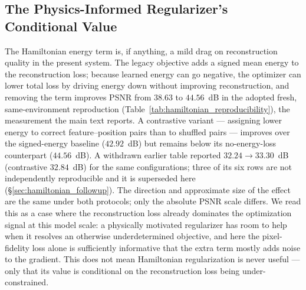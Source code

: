 \documentclass[11pt]{article}
\begin{document}
\subsection{The Physics-Informed Regularizer's Conditional Value}
The Hamiltonian energy term is, if anything, a mild drag on reconstruction quality in the present system. The legacy objective adds a signed mean energy to the reconstruction loss; because learned energy can go negative, the optimizer can lower total loss by driving energy down without improving reconstruction, and removing the term improves PSNR from $38.63$ to $44.56$~dB in the adopted fresh, same-environment reproduction (Table~\ref{tab:hamiltonian_reproducibility}), the measurement the main text reports. A contrastive variant --- assigning lower energy to correct feature--position pairs than to shuffled pairs --- improves over the signed-energy baseline ($42.92$~dB) but remains below its no-energy-loss counterpart ($44.56$~dB). A withdrawn earlier table reported $32.24\rightarrow33.30$~dB (contrastive $32.84$~dB) for the same configurations; three of its six rows are not independently reproducible and it is superseded here (\S\ref{sec:hamiltonian_followup}). The direction and approximate size of the effect are the same under both protocols; only the absolute PSNR scale differs. We read this as a case where the reconstruction loss already dominates the optimization signal at this model scale: a physically motivated regularizer has room to help when it resolves an otherwise underdetermined objective, and here the pixel-fidelity loss alone is sufficiently informative that the extra term mostly adds noise to the gradient. This does not mean Hamiltonian regularization is never useful --- only that its value is conditional on the reconstruction loss being under-constrained.
\end{document}
